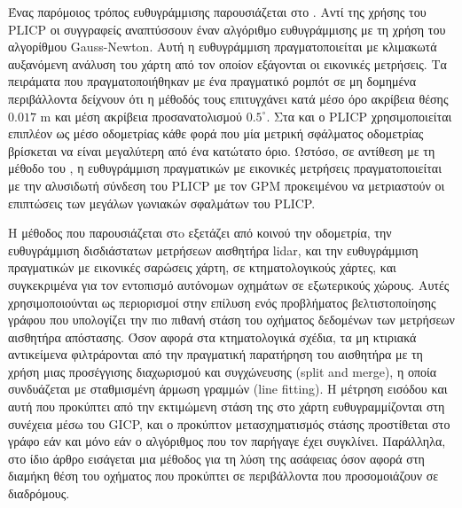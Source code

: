 Ένας παρόμοιος τρόπος ευθυγράμμισης παρουσιάζεται στο \cite{Peng2018a}. Αντί
της χρήσης του PLICP οι συγγραφείς αναπτύσσουν έναν αλγόριθμο ευθυγράμμισης με
τη χρήση του αλγορίθμου Gauss-Newton.  Αυτή η ευθυγράμμιση πραγματοποιείται με
κλιμακωτά αυξανόμενη ανάλυση του χάρτη από τον οποίον εξάγονται οι εικονικές
μετρήσεις.  Τα πειράματα που πραγματοποιήθηκαν με ένα πραγματικό ρομπότ σε μη
δομημένα περιβάλλοντα δείχνουν ότι η μέθοδός τους επιτυγχάνει κατά μέσο όρο
ακρίβεια θέσης $0.017$ m και μέση ακρίβεια προσανατολισμού $0.5^\circ$. Στα
\cite{Chen2019a} και \cite{Liu2019a} ο PLICP χρησιμοποιείται επιπλέον ως μέσο
οδομετρίας κάθε φορά που μία μετρική σφάλματος οδομετρίας βρίσκεται να είναι
μεγαλύτερη από ένα κατώτατο όριο. Ωστόσο, σε αντίθεση με τη μέθοδο του
\cite{Peng2018a}, η ευθυγράμμιση πραγματικών με εικονικές μετρήσεις
πραγματοποιείται με την αλυσιδωτή σύνδεση του PLICP με τον GPM \cite{Censib}
προκειμένου να μετριαστούν οι επιπτώσεις των μεγάλων γωνιακών σφαλμάτων του
PLICP.

Η μέθοδος που παρουσιάζεται στo \cite{Bresson2019a} εξετάζει από κοινού την
οδομετρία, την ευθυγράμμιση δισδιάστατων μετρήσεων αισθητήρα lidar, και την
ευθυγράμμιση πραγματικών με εικονικές σαρώσεις χάρτη, σε κτηματολογικούς
χάρτες, και συγκεκριμένα για τον εντοπισμό αυτόνομων οχημάτων σε εξωτερικούς
χώρους. Αυτές χρησιμοποιούνται ως περιορισμοί στην επίλυση ενός προβλήματος
βελτιστοποίησης γράφου που υπολογίζει την πιο πιθανή στάση του οχήματος
δεδομένων των μετρήσεων αισθητήρα απόστασης. Όσον αφορά στα κτηματολογικά
σχέδια, τα μη κτιριακά αντικείμενα φιλτράρονται από την πραγματική παρατήρηση
του αισθητήρα με τη χρήση μιας προσέγγισης διαχωρισμού και συγχώνευσης (split
and merge), η οποία συνδυάζεται με σταθμισμένη άρμωση γραμμών (line fitting). Η
μέτρηση εισόδου και αυτή που προκύπτει από την εκτιμώμενη στάση της στο χάρτη
ευθυγραμμίζονται στη συνέχεια μέσω του GICP, και ο προκύπτον μετασχηματισμός
στάσης προστίθεται στο γράφο εάν και μόνο εάν ο αλγόριθμος που τον παρήγαγε
έχει συγκλίνει. Παράλληλα, στο ίδιο άρθρο εισάγεται μια μέθοδος για τη λύση της
ασάφειας όσον αφορά στη διαμήκη θέση του οχήματος που προκύπτει σε περιβάλλοντα
που προσομοιάζουν σε διαδρόμους.


